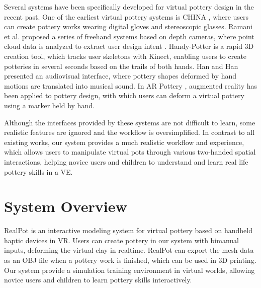 \documentclass{svjour3}                     %
\begin{document}
Several systems have been specifically developed for virtual pottery design in the recent past.
One of the earliest virtual pottery systems is CHINA \cite{korida1997interactive}, where users can create pottery works wearing digital gloves and stereoscopic glasses.
Ramani et al. proposed a series of freehand systems based on depth cameras, where point cloud data is analyzed to extract user design intent \cite{ramani2014zpots,ramani2015gesture,ramani2016extracting}.
Handy-Potter \cite{murugappan2013handy} is a rapid 3D creation tool, which tracks user skeletons with Kinect, enabling users to create potteries in several seconds based on the trails of both hands.
Han and Han \cite{han2014virtual} presented an audiovisual interface, where pottery shapes deformed by hand motions are translated into musical sound.
In AR Pottery \cite{han2007ar}, augmented reality has been applied to pottery design, with which users can deform a virtual pottery using a marker held by hand.

Although the interfaces provided by these systems are not difficult to learn, some realistic features are ignored and the workflow is oversimplified.
In contrast to all existing works, our system provides a much realistic workflow and experience, which allows users to manipulate virtual pots through various two-handed spatial interactions, helping novice users and children to understand and learn real life pottery skills in a VE.


\section{System Overview}
\label{sec:3}
RealPot is an interactive modeling system for virtual pottery based on handheld haptic devices in VR.
Users can create pottery in our system with bimanual inputs, deforming the virtual clay in realtime.
RealPot can export the mesh data as an OBJ file when a pottery work is finished, which can be used in 3D printing.
Our system provide a simulation training environment in virtual worlds, allowing novice users and children to learn pottery skills interactively.
\end{document}
